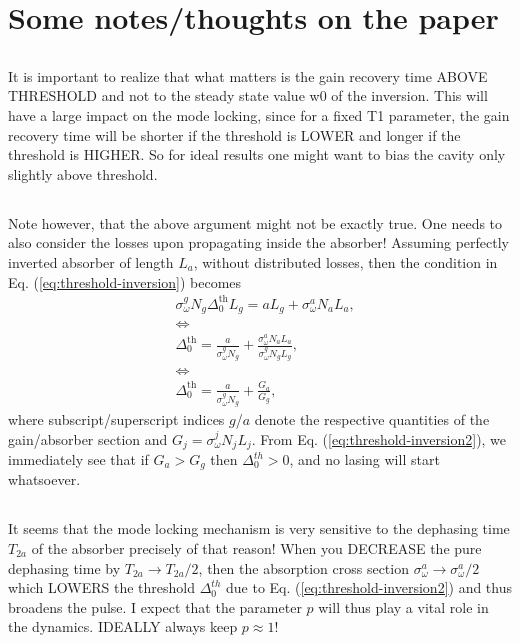 \documentclass[preprint,secnumarabic,amssymb, nobibnotes, aip, prd]{revtex4-1}
\begin{document}
\section{Some notes/thoughts on the paper}
\subsection{}
	It is important to realize that what matters is the gain recovery time ABOVE THRESHOLD and not to the steady state value w0 of the inversion. This will have a large impact on the mode locking, since for a fixed T1 parameter, the gain recovery time will be shorter if the threshold is LOWER and longer if the threshold is HIGHER. So for ideal results one might want to bias the cavity only slightly above threshold.
\subsection{}
	Note however, that the above argument might not be exactly true. One needs to also consider the losses upon propagating inside the absorber! Assuming perfectly inverted absorber of length $L_a$, without distributed losses, then the condition in Eq. (\ref{eq:threshold-inversion}) becomes
	\begin{align}
	\label{eq:threshold-inversion2}
	&\sigma_{\omega}^{g}N_g\Delta_0^{\text{th}}L_g = aL_g+ \sigma_{\omega}^a N_a L_a, \nonumber \\
	& \Leftrightarrow \nonumber \\
	&\Delta_0^{\text{th}} = \frac{a}{\sigma_{\omega}^{g}N_g} + \frac{\sigma_{\omega}^{a}N_a L_a}{\sigma_{\omega}^{g}N_g L_g}, \nonumber \\
	& \Leftrightarrow \nonumber \\
	&\Delta_0^{\text{th}} = \frac{a}{\sigma_{\omega}^{g}N_g} +  \frac{G_a}{G_g},
	\end{align}
	where subscript/superscript indices $g$/$a$ denote the respective quantities of the gain/absorber section and $G_j = \sigma_{\omega}^{j}N_j L_j$. From Eq. (\ref{eq:threshold-inversion2}), we immediately see that 
	if $G_a>G_g$ then $\Delta_0^{th} > 0$, and no lasing will start whatsoever. 
\subsection{}
	It seems that the mode locking mechanism is very sensitive to the dephasing time $T_{2a}$ of the absorber precisely of that reason! When you DECREASE the pure dephasing time by $T_{2a}\rightarrow T_{2a}/2$, then the absorption cross section $\sigma_\omega^{a} \rightarrow \sigma_\omega^{a}/2$ which LOWERS the threshold $\Delta_{0}^{th}$ due to Eq. (\ref{eq:threshold-inversion2}) and thus broadens the pulse. I expect that the parameter $p$ will thus play a vital role in the dynamics. IDEALLY always keep $p \approx 1$!  
\end{document}
